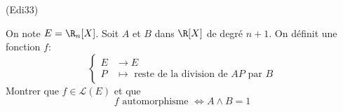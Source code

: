 \begin{tiny}(Edi33)\end{tiny} On note $E=\R_n[X]$. Soit $A$ et $B$ dans $\R[X]$ de degré $n+1$. On définit une fonction $f$:
\begin{displaymath}
  \left\lbrace 
\begin{aligned}
  E &\rightarrow E \\ 
  P &\mapsto \text{ reste de la division de $AP$ par $B$}
\end{aligned}
\right. 
\end{displaymath}
Montrer que $f\in \mathcal{L}(E)$ et que 
\begin{displaymath}
  f \text{ automorphisme } \Leftrightarrow A \wedge B = 1
\end{displaymath}
